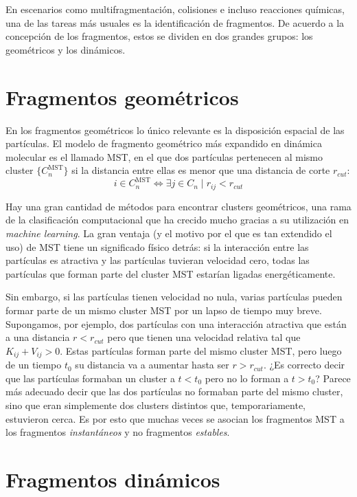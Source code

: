 En escenarios como multifragmentación, colisiones e incluso reacciones químicas, una de las tareas más usuales es la identificación de fragmentos.
De acuerdo a la concepción de los fragmentos, estos se dividen en dos grandes grupos: los geométricos y los dinámicos.

\section{Fragmentos geométricos}
En los fragmentos geométricos lo único relevante es la disposición espacial de las partículas.
El modelo de fragmento geométrico más expandido en dinámica molecular es el llamado MST, en el que dos partículas pertenecen al mismo cluster $\{C^{\text{MST}}_n\}$ si la distancia entre ellas es menor que una distancia de corte $r_{cut}$:
\begin{equation*}
  i \in C^{\text{MST}}_n \Leftrightarrow \exists j \in C_n \mid
  r_{ij} < r_{cut}
\end{equation*}

Hay una gran cantidad de métodos para encontrar clusters geométricos, una rama de la clasificación computacional que ha crecido mucho gracias a su utilización en \emph{machine learning}.
La gran ventaja (y el motivo por el que es tan extendido el uso) de MST tiene un significado físico detrás: si la interacción entre las partículas es atractiva y las partículas tuvieran velocidad cero, todas las partículas que forman parte del cluster MST estarían ligadas energéticamente.

Sin embargo, si las partículas tienen velocidad no nula, varias partículas pueden formar parte de un mismo cluster MST por un lapso de tiempo muy breve.
Supongamos, por ejemplo, dos partículas con una interacción atractiva que están a una distancia $r<r_{cut}$ pero que tienen una velocidad relativa tal que $K_{ij} + V_{ij} > 0$.
Estas partículas forman parte del mismo cluster MST, pero luego de un tiempo $t_0$ su distancia va a aumentar hasta ser $r > r_{cut}$.
¿Es correcto decir que las partículas formaban un cluster a $t<t_0$ pero no lo forman a $t>t_0$?
Parece más adecuado decir que las dos partículas no formaban parte del mismo cluster, sino que eran simplemente dos clusters distintos que, temporariamente, estuvieron cerca.
Es por esto que muchas veces se asocian los fragmentos MST a los fragmentos \emph{instantáneos} y no fragmentos \emph{estables}.

\section{Fragmentos dinámicos}

